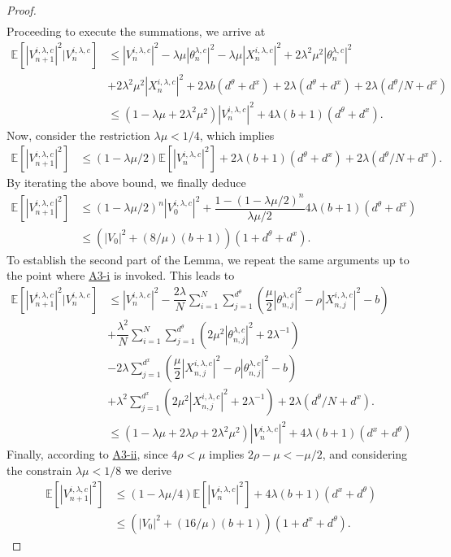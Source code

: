 \documentclass[a4paper, 10pt]{article}
\theoremstyle{plain}%
\begin{document}
\begin{proof}
\begin{align*}
\end{align*}
Proceeding to execute the summations, we arrive at
\begin{align*}
\mathbb{E}\left[\left|V_{n+1}^{i,\lambda,c}\right|^2|V_{n}^{i,\lambda,c}\right]&\leq \left|V_{n}^{i,\lambda,c}\right|^2-\lambda\mu|\theta^{\lambda,c}_{n}|^2-\lambda\mu|X^{i,\lambda,c}_{n}|^2+2\lambda^2\mu^2|\theta^{\lambda,c}_{n}|^2\\
&+2\lambda^2\mu^2|X^{i,\lambda,c}_{n}|^2+2\lambda b(d^{\theta}+d^x)+2\lambda(d^{\theta}+d^x)+2\lambda(d^{\theta}/N+d^x)\\
&\leq (1-\lambda\mu+2\lambda^2\mu^2)\left|V_{n}^{i,\lambda,c}\right|^2+4\lambda(b+1)(d^{\theta}+d^x).
\end{align*}
Now, consider the restriction $\lambda\mu<1/4$, which implies
\begin{align*}
\mathbb{E}\left[\left|V_{n+1}^{i,\lambda,c}\right|^2\right]&\leq (1-\lambda\mu/2)\mathbb{E}\left[\left|V_{n}^{i,\lambda,c}\right|^2\right]+2\lambda(b+1)(d^{\theta}+d^x)+2\lambda(d^{\theta}/N+d^x).
\end{align*}
By iterating the above bound, we finally deduce 
\begin{align*}
\mathbb{E}\left[\left|V_{n+1}^{i,\lambda,c}\right|^2\right]&\leq (1-\lambda\mu/2)^n\left|V_{0}^{i,\lambda,c}\right|^2+\dfrac{1-(1-\lambda\mu/2)^n}{\lambda\mu/2}4\lambda(b+1)(d^{\theta}+d^x)\\
&\leq \left(\left|V_{0}\right|^2+ (8/\mu)(b+1)\right)(1+d^{\theta}+d^x).
\end{align*}
To establish the second part of the Lemma, we repeat the same arguments up to the point where \hyperlink{Assum3a}{A3-i} is invoked. This leads to
\begin{align*}
    \mathbb{E}\left[\left|V_{n+1}^{i,\lambda,c}\right|^2|V_{n}^{i,\lambda,c}\right]&\leq \left|V_{n}^{i,\lambda,c}\right|^2-\dfrac{2\lambda}{N}\sum_{i=1}^N\sum_{j=1}^{d^{\theta}}\left(\dfrac{\mu}{2}|\theta^{\lambda,c}_{n,j}|^2-\rho|X_{n,j}^{i,\lambda,c}|^2-b\right)\\&+ \dfrac{\lambda^2}{N}\sum_{i=1}^N\sum_{j=1}^{d^{\theta}}\left(2\mu^2|\theta^{\lambda,c}_{n,j}|^2+2\lambda^{-1}\right)\\&-2\lambda\sum_{j=1}^{d^{x}}\left(\dfrac{\mu}{2}|X^{i,\lambda,c}_{n,j}|^2-\rho|\theta^{\lambda,c}_{n,j}|^2-b\right)\\&+\lambda^2\sum_{j=1}^{d^{x}}\left(2\mu^2|X^{i,\lambda,c}_{n,j}|^2+2\lambda^{-1}\right)+2\lambda(d^{\theta}/N+d^x).\\
    &\leq \left(1-\lambda\mu+2\lambda\rho+2\lambda^2\mu^2\right)\left|V_{n}^{i,\lambda,c}\right|^2+4\lambda(b+1)(d^x+d^{\theta})
\end{align*}
Finally, according to \hyperlink{Assum3b}{A3-ii}, since $4\rho<\mu$ implies $2\rho-\mu<-\mu/2$, and considering the constrain $\lambda\mu<1/8$ we derive
\begin{align*}
    \mathbb{E}\left[\left|V_{n+1}^{i,\lambda,c}\right|^2\right]&\leq (1-\lambda\mu/4)\mathbb{E}\left[\left|V_{n}^{i,\lambda,c}\right|^2\right]+4\lambda(b+1)(d^x+d^{\theta})\\
    &\leq \left(|V_0|^2+(16/\mu)(b+1)\right)\left(1+d^x+d^{\theta}\right).
\end{align*}
\end{proof}
\end{document}
